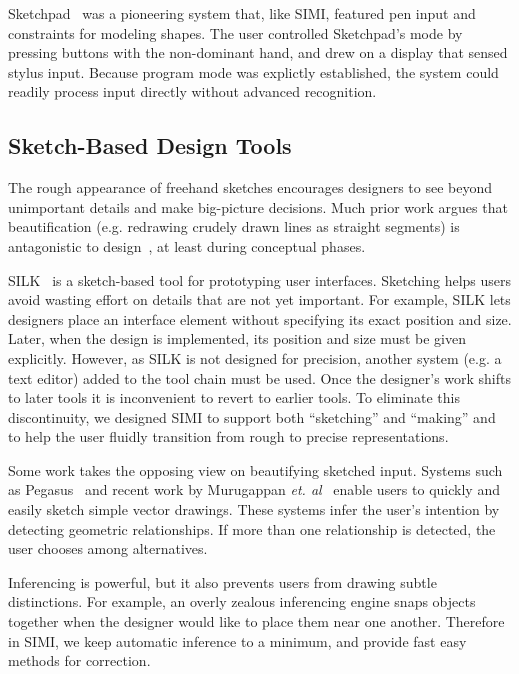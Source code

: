 \documentclass{article}
\begin{document}
Sketchpad~\cite{sutherland-sketchpad} was a pioneering system that,
like SIMI, featured pen input and constraints for modeling shapes. The
user controlled Sketchpad's mode by pressing buttons with the
non-dominant hand, and drew on a display that sensed stylus
input. Because program mode was explictly established, the system
could readily process input directly without advanced recognition.

\subsection{Sketch-Based Design Tools}

The rough appearance of freehand sketches encourages designers to see
beyond unimportant details and make big-picture decisions. Much prior
work argues that beautification (e.g. redrawing crudely drawn lines as
straight segments) is antagonistic to design~\cite{gross-cocktail}, at
least during conceptual phases.

SILK~\cite{landay-silk-chi} is a sketch-based tool for prototyping
user interfaces. Sketching helps users avoid wasting effort on details
that are not yet important. For example, SILK lets designers place an
interface element without specifying its exact position and
size. Later, when the design is implemented, its position and size
must be given explicitly. However, as SILK is not designed for
precision, another system (e.g. a text editor) added to the tool chain
must be used. Once the designer's work shifts to later tools it is
inconvenient to revert to earlier tools. To eliminate this
discontinuity, we designed SIMI to support both ``sketching'' and
``making'' and to help the user fluidly transition from rough to
precise representations.

Some work takes the opposing view on beautifying sketched
input. Systems such as Pegasus~\cite{igarashi-pegasus} and recent work
by Murugappan \textit{et. al}~\cite{murugappan-beautification} enable
users to quickly and easily sketch simple vector drawings. These
systems infer the user's intention by detecting geometric
relationships. If more than one relationship is detected, the user
chooses among alternatives.

Inferencing is powerful, but it also prevents users from drawing
subtle distinctions. For example, an overly zealous inferencing engine
snaps objects together when the designer would like to place them near
one another. Therefore in SIMI, we keep automatic inference to a
minimum, and provide fast easy methods for correction.
\end{document}
